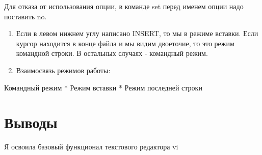 \documentclass[
  12pt,
  a4paper,
]{scrreprt}
\begin{document}
Для отказа от использования опции, в команде set перед именем опции надо
поставить no.

\begin{enumerate}
\def\labelenumi{\arabic{enumi}.}
\setcounter{enumi}{11}
\item
  Если в левом нижнем углу написано INSERT, то мы в режиме вставки. Если
  курсор находится в конце файла и мы видим двоеточие, то это режим
  командной строки. В остальных случаях - командный режим.
\item
  Взаимосвязь режимов работы:
\end{enumerate}

Командный режим * Режим вставки * Режим последней строки

\hypertarget{ux432ux44bux432ux43eux434ux44b}{%
\chapter{Выводы}\label{ux432ux44bux432ux43eux434ux44b}}

Я освоила базовый функционал текстового редактора vi
\end{document}
